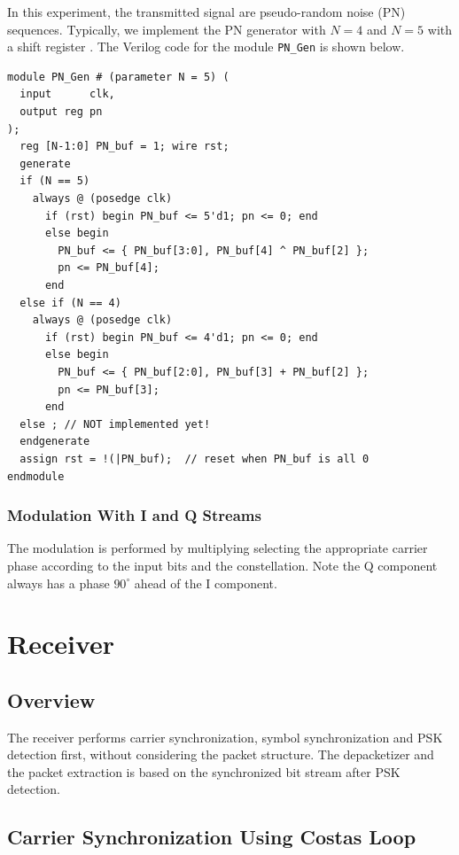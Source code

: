 \documentclass[journal,twoside]{IEEEtran}
\begin{document}
      In this experiment, the transmitted signal are pseudo-random noise (PN) sequences.
      Typically, we implement the PN generator with $N=4$ and $N=5$ with a shift register \cite{james1990review}.
      The Verilog code for the module \texttt{PN\_Gen} is shown below.
      \begin{verbatim}
module PN_Gen # (parameter N = 5) (
  input      clk,
  output reg pn
);
  reg [N-1:0] PN_buf = 1; wire rst;
  generate
  if (N == 5)
    always @ (posedge clk)
      if (rst) begin PN_buf <= 5'd1; pn <= 0; end
      else begin
        PN_buf <= { PN_buf[3:0], PN_buf[4] ^ PN_buf[2] };
        pn <= PN_buf[4];
      end
  else if (N == 4)
    always @ (posedge clk)
      if (rst) begin PN_buf <= 4'd1; pn <= 0; end
      else begin
        PN_buf <= { PN_buf[2:0], PN_buf[3] + PN_buf[2] };
        pn <= PN_buf[3];
      end
  else ; // NOT implemented yet!
  endgenerate
  assign rst = !(|PN_buf);  // reset when PN_buf is all 0
endmodule
      \end{verbatim}

    \subsubsection{Modulation With I and Q Streams}

      The modulation is performed by multiplying selecting the appropriate carrier phase
      according to the input bits and the constellation.
      Note the Q component always has a phase $90^\circ$ ahead of the I component.

  \section{Receiver}

    \subsection{Overview}

      The receiver performs carrier synchronization, symbol synchronization and PSK detection first,
      without considering the packet structure.
      The depacketizer and the packet extraction is based on the synchronized bit stream after PSK detection.

    \subsection{Carrier Synchronization Using Costas Loop}
\end{document}

